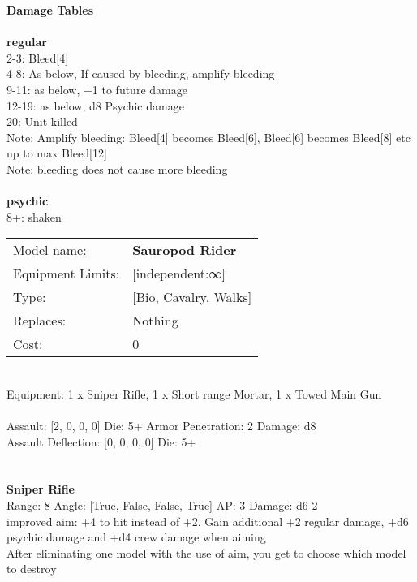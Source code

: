 {\bf Damage Tables} \\
\ \\ {\bf regular } \\
2-3: Bleed[4] \\
4-8: As below, If caused by bleeding, amplify bleeding \\
9-11: as below, +1 to future damage \\
12-19: as below, d8 Psychic damage \\
20: Unit killed \\
Note: Amplify bleeding: Bleed[4] becomes Bleed[6], Bleed[6] becomes Bleed[8] etc up to max Bleed[12] \\
Note: bleeding does not cause more bleeding \\
\ \\ {\bf psychic } \\
8+: shaken \\


\noindent
\begin{tabular}{ll}
Model name: &{\bf Sauropod Rider } \\
Equipment Limits: &[independent:∞] \\
Type: &[Bio, Cavalry, Walks] \\
Replaces: &Nothing \\
Cost: & 0\\
\end{tabular}
\ \\
Equipment: 1 x Sniper Rifle, 1 x Short range Mortar, 1 x Towed Main Gun \\
\ \\
Assault: [2, 0, 0, 0] Die: 5+ Armor Penetration: 2 Damage: d8 \\
Assault Deflection: [0, 0, 0, 0] Die: 5+\\
\indent  
\ \\

\ \\
{\bf Sniper Rifle } \\



Range: 8  Angle: [True, False, False, True] AP: 3 Damage: d6-2 \\
improved aim: +4 to hit instead of +2. Gain additional +2 regular damage, +d6 psychic damage and +d4 crew damage when aiming\\ 
After eliminating one model with the use of aim, you get to choose which model to destroy\\ 




